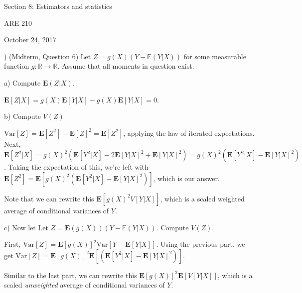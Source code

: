 \documentclass[12pt,english]{article}
\newcommand{\expec}{\ensuremath{\mathbb E}}
\begin{document}
\begin{center}
{\Large{}Section 8: Estimators and statistics}
\par\end{center}{\Large \par}

\begin{center}
ARE 210
\par\end{center}

\begin{center}
October 24, 2017
\par\end{center}

) (Midterm, Question 6) Let $Z=g(X)(Y-\expec(Y|X))$ for some measurable  function $g:\mathbb{R}\rightarrow\mathbb{R}$. Assume that all moments in
question exist.

a) Compute $\mathbf{E}(Z|X)$.
\vspace{1em}

$\mathbf{E}[Z | X] = g(X) \mathbf{E}[Y | X] - g(X) \mathbf{E}[Y | X] = 0$.

\vspace{1em}
b) Compute $V(Z)$
\vspace{1em}

$\text{Var}[Z] = \mathbf{E}[Z^{2}] - \mathbf{E}[Z]^{2} = \mathbf{E}[Z^{2}]$, applying the law of iterated expectations. Next, $\mathbf{E}[Z^{2} | X] = g(X)^{2} (\mathbf{E}[Y^{2} | X] - 2 \mathbf{E}[Y | X]^{2} + \mathbf{E}[Y | X]^{2}) = g(X)^{2} (\mathbf{E}[Y^{2} | X] - \mathbf{E}[Y | X]^{2})$. Taking the expectation of this, we're left with $\mathbf{E}[Z^{2}] = \mathbf{E}[ g(X)^{2}(\mathbf{E}[Y^{2} | X] - \mathbf{E}[Y | X]^{2}) ]$, which is our answer.

Note that we can rewrite this $\mathbf{E}[g(X)^{2} V[Y | X]]$, which is a scaled weighted average of conditional variances of $Y$.

\vspace{1em}
c) Now let Let $Z=\mathbf{E}(g(X))(Y-\expec(Y|X))$. Compute $V(Z)$.
\vspace{1em}

First, $\text{Var}[Z] = \mathbf{E}[g(X)]^{2} \text{Var}[Y - \mathbf{E}[Y | X]]$. Using the previous part, we get $\text{Var}[Z] = \mathbf{E}[g(X)]^{2} \mathbf{E}[ (\mathbf{E}[Y^{2} | X] - \mathbf{E}[Y | X]^{2})]$.

Similar to the last part, we can rewrite this $\mathbf{E}[g(X)]^{2} \mathbf{E}[V[Y | X]]$, which is a scaled \textit{unweighted} average of conditional variances of $Y$.
\end{document}
